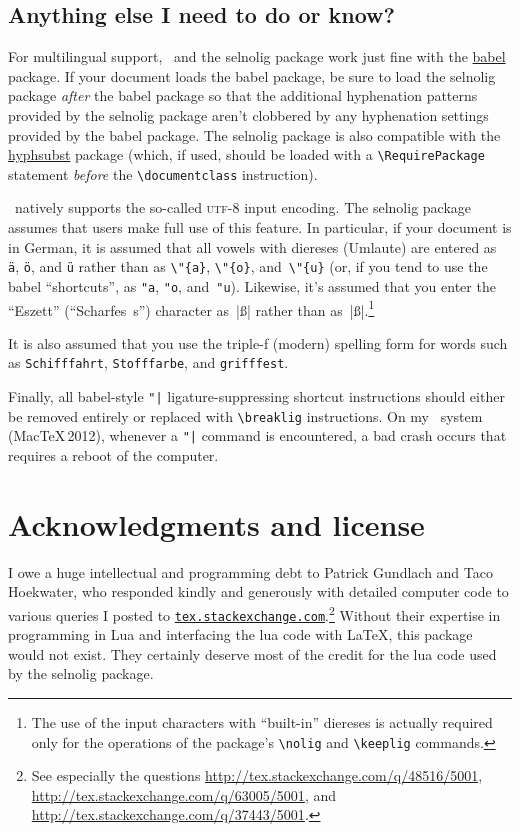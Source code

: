 \documentclass[12pt]{article}
\newcommand{\pkg}[1]{\textsf{#1}}
\newcommand{\cmmd}[1]{\texttt{\textbackslash #1}}
\begin{document}
\subsection{Anything else I need to do or know?} \label{sec:anythingelse}

For multilingual support, \LuaLaTeX\ and the \pkg{selnolig} package work just fine with the \href{http://www.ctan.org/pkg/babel}{\pkg{babel}} package. If your document loads the \pkg{babel} package, be sure to load the \pkg{selnolig} package \emph{after} the \pkg{babel} package so that the additional hyphenation patterns provided by the \pkg{selnolig} package aren't clobbered by any hyphenation settings provided by the \pkg{babel} package. The \pkg{selnolig} package is also compatible with the \href{http://www.ctan.org/pkg/hyphsubst}{\pkg{hyphsubst}} package (which, if used, should be loaded with a \Verb+\RequirePackage+ statement \emph{before} the \Verb+\documentclass+ instruction).

\LuaLaTeX\ natively supports the so-called \textsc{utf}-8 input encoding. The \pkg{selnolig} package assumes that users make full use of this feature. In particular, if your document is in German, it is assumed that all vowels with diereses (Umlaute) are entered as \Verb|ä|, \Verb|ö|, and \Verb|ü| rather than as \Verb|\"{a}|, \Verb|\"{o}|, and~\Verb|\"{u}| (or, if you tend to use the \pkg{babel} \enquote{shortcuts}, as \Verb|"a|, \Verb|"o|, and~\Verb|"u|). Likewise, it's assumed that you enter the \enquote{Eszett} (\enquote{Scharfes~s}) character as~|ß| rather than as~|{\ss}|.\footnote{The use of the input characters with \enquote{built-in} diereses is actually required only for the operations of the package's \cmmd{nolig} and \cmmd{keeplig} commands.}

It is also assumed that you use the triple-f (modern) spelling form for words such as \texttt{Schifffahrt}, \texttt{Stofffarbe}, and \texttt{grifffest}.

Finally, all \pkg{babel}-style \Verb+"|+ ligature-suppressing shortcut instructions should either be removed entirely or replaced with \Verb+\breaklig+ instructions. On my \LuaLaTeX\ system (MacTeX\,2012), whenever a \Verb+"|+ command is encountered, a bad crash occurs that requires a reboot of the computer.


\section{Acknowledgments and license}

I owe a huge intellectual and programming debt to Patrick Gundlach and Taco Hoekwater, who responded kindly and generously with detailed computer code to various queries I posted to \href{http://tex.stackexchange.com}{\texttt{tex.stackexchange.com}}.\footnote{See especially the questions \url{http://tex.stackexchange.com/q/48516/5001}, \url{http://tex.stackexchange.com/q/63005/5001}, and
\url{http://tex.stackexchange.com/q/37443/5001}.} Without their expertise in programming in Lua and interfacing the lua code with \LaTeX, this package would not exist. They certainly deserve most of the credit for the lua code used by the \pkg{selnolig} package.
\end{document}
